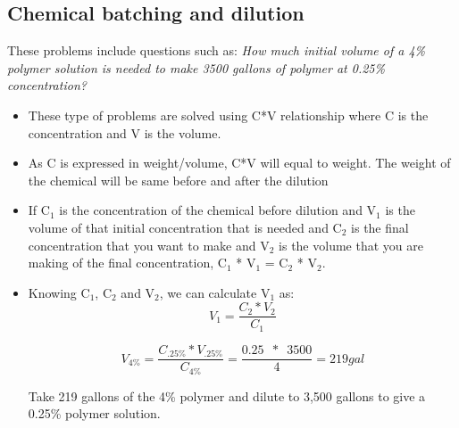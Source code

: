 \subsection{Chemical batching and dilution}

These problems include questions such as:  \textit{How much initial volume of a 4\% polymer solution is needed to make 3500 gallons of polymer at 0.25\% concentration?}\\
\begin{itemize}
\item These type of problems are solved using C*V relationship where C is the concentration and V is the volume.

\item As C is expressed in weight/volume, C*V will equal to weight.  The weight of the chemical will be same before and after the dilution

\item If C$_1$ is the concentration of the chemical before dilution and V$_1$ is the volume of that initial concentration that is needed and C$_2$ is the final concentration that you want to make and V$_2$ is the volume that you are making of the final concentration, C$_1$ * V$_1$ = C$_2$ * V$_2$.

\item Knowing C$_1$, C$_2$ and V$_2$, we can calculate V$_1$ as: $$V_1 = \dfrac{C_2 * V_2}{C_1}$$

$$V_{4\%} = \dfrac{C_{.25\%} * V_{.25\%}}{C_{4\%}} = \dfrac{0.25 \enspace * \enspace 3500}{4}= 219 gal $$ 

Take 219 gallons of the 4\% polymer and dilute to 3,500 gallons to give a 0.25\% polymer solution.

\end{itemize}